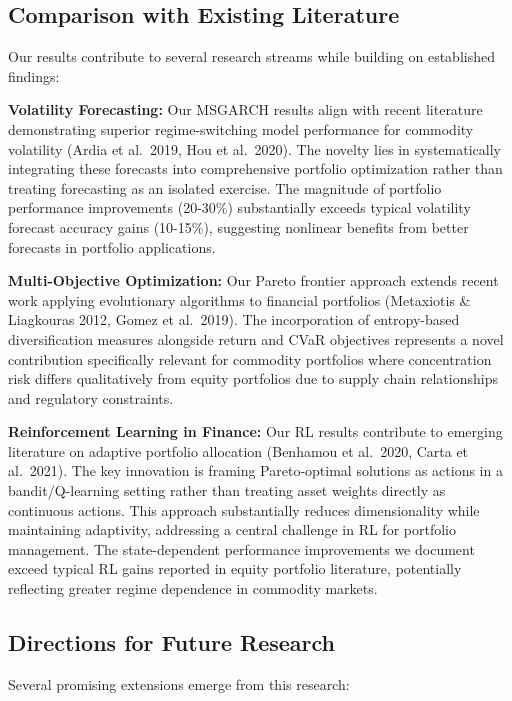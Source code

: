 \documentclass[
  10pt,
  a4paper,
]{article}
\begin{document}
\begin{tcolorbox}
\subsection{Comparison with Existing
Literature}\label{comparison-with-existing-literature}

Our results contribute to several research streams while building on
established findings:

\textbf{Volatility Forecasting:} Our MSGARCH results align with recent
literature demonstrating superior regime-switching model performance for
commodity volatility (Ardia et al.~2019, Hou et al.~2020). The novelty
lies in systematically integrating these forecasts into comprehensive
portfolio optimization rather than treating forecasting as an isolated
exercise. The magnitude of portfolio performance improvements (20-30\%)
substantially exceeds typical volatility forecast accuracy gains
(10-15\%), suggesting nonlinear benefits from better forecasts in
portfolio applications.

\textbf{Multi-Objective Optimization:} Our Pareto frontier approach
extends recent work applying evolutionary algorithms to financial
portfolios (Metaxiotis \& Liagkouras 2012, Gomez et al.~2019). The
incorporation of entropy-based diversification measures alongside return
and CVaR objectives represents a novel contribution specifically
relevant for commodity portfolios where concentration risk differs
qualitatively from equity portfolios due to supply chain relationships
and regulatory constraints.

\textbf{Reinforcement Learning in Finance:} Our RL results contribute to
emerging literature on adaptive portfolio allocation (Benhamou et
al.~2020, Carta et al.~2021). The key innovation is framing
Pareto-optimal solutions as actions in a bandit/Q-learning setting
rather than treating asset weights directly as continuous actions. This
approach substantially reduces dimensionality while maintaining
adaptivity, addressing a central challenge in RL for portfolio
management. The state-dependent performance improvements we document
exceed typical RL gains reported in equity portfolio literature,
potentially reflecting greater regime dependence in commodity markets.

\subsection{Directions for Future
Research}\label{directions-for-future-research}

Several promising extensions emerge from this research:


\end{tcolorbox}
\end{document}
